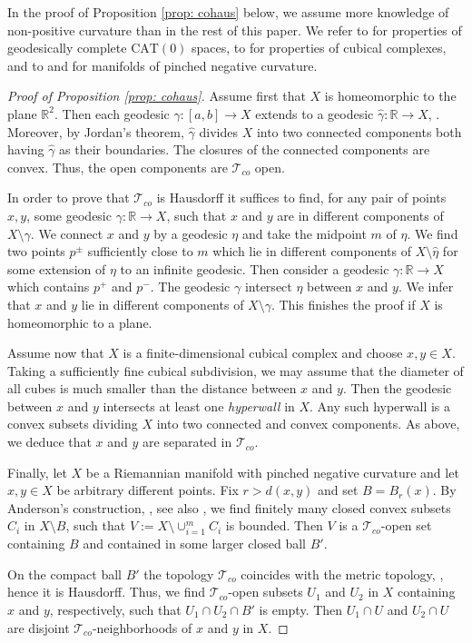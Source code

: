 \documentclass[12pt,leqno]{amsart}
\numberwithin{equation}{section}
\theoremstyle{remark}
\newcommand{\CAT}{\mathrm{CAT}}
\newcommand{\R}{\mathbb{R}}
\begin{document}
In the proof of Proposition \ref{prop: cohaus} below, we assume more knowledge of non-positive curvature than in the rest of this paper.
We refer 
to \cite{LN1} for properties of geodesically complete $\CAT(0)$ spaces,
to \cite{Schwer} for properties of cubical complexes,
and to \cite{Anderson} and \cite{Borbely} for manifolds of pinched negative curvature.

\begin{proof}[Proof of Proposition \ref{prop: cohaus}]
Assume first that $X$ is homeomorphic to the plane $\R^2$.
Then each geodesic $\gamma \colon[a,b]\to X$ extends to a geodesic $\hat \gamma \colon\R \to X$, \cite{BH}.
Moreover, by Jordan's theorem, $\hat \gamma$ divides $X$ into two connected components both having $\hat \gamma$ as their boundaries. The closures of the connected components are convex.
Thus, the open components are $\mathcal T_{co}$ open.
	
In order to prove that $\mathcal T_{co}$ is Hausdorff it suffices to find, for any pair of points $x,y$, some geodesic $\gamma \colon\R \to X$, such that $x$ and $y$ are in different components of $X\setminus \gamma$.
We connect $x$ and $y$ by a geodesic $\eta$ and take the midpoint $m$ of $\eta$.
We find two points $p^{\pm}$ sufficiently close to $m$ which lie in different components of $X\setminus \hat \eta$ for some extension of $\eta$ to an infinite geodesic.
Then consider a geodesic $\gamma\colon\R \to X$ which contains $p^+$ and $p^-$.
The geodesic $\gamma$ intersect $\eta$ between $x$ and $y$.
We infer that $x$ and $y$ lie in different components of $X\setminus \gamma$.
This finishes the proof if $X$ is homeomorphic to a plane.
	
	 
	 
	
	Assume now that $X$ is a finite-dimensional cubical complex and choose $x,y\in X$. Taking a sufficiently fine cubical subdivision, we may assume that the diameter of all cubes is much smaller than the distance between $x$ and $y$. Then the geodesic between $x$ and $y$ intersects at least one \emph{hyperwall} in $X$. Any such hyperwall is a convex subsets dividing $X$ into two connected and convex components. As above, we deduce that $x$ and $y$ are separated in $\mathcal T_{co}$. 
	
	
	
	
	Finally, let $X$ be a Riemannian manifold with pinched negative curvature and let $x,y\in X$
	be arbitrary different points. Fix $r>d(x,y)$ and set $B=B_r (x)$. By Anderson's construction, \cite{Anderson}, see also \cite[Theorem 2.1]{Borbely}, we find finitely many closed convex subsets $C_i$ in $X\setminus B$, such that $V\mathrel{:=}X\setminus \cup _{i=1}^m C_i$
	is bounded. Then $V$ is a $\mathcal T_{co}$-open set containing $B$ and contained in some larger closed ball $B'$. 
	
	On the compact ball $B'$ the topology $\mathcal T_{co}$ coincides with the metric topology, \cite[Lemma 17]{Monod}, hence it is Hausdorff. Thus, we find $\mathcal T_{co}$-open subsets 
	$U_1$ and $U_2$ in $X$ containing $x$ and $y$, respectively, such that $U_1\cap U_2\cap B'$ is empty. Then $U_1\cap U$ and $U_2\cap U$ are disjoint $\mathcal T_{co}$-neighborhoods of $x$ and $y$ in $X$.
\end{proof}
\end{document}
